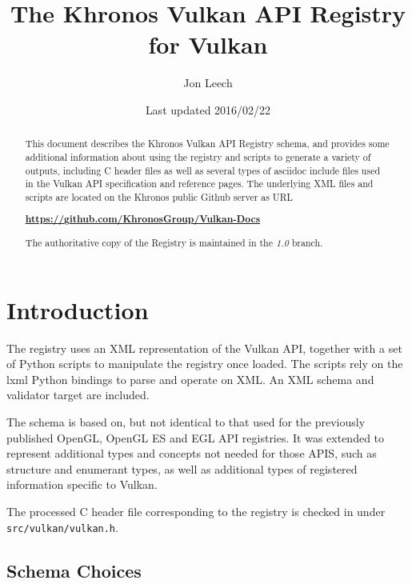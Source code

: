 \documentclass{article}
\begin{document}
\title{The Khronos Vulkan API Registry for Vulkan}
\author{Jon Leech}
\date{Last updated 2016/02/22}
\maketitle

\begin{abstract}

This document describes the Khronos Vulkan API Registry schema, and provides
some additional information about using the registry and scripts to generate
a variety of outputs, including C header files as well as several types of
asciidoc include files used in the Vulkan API specification and reference
pages. The underlying XML files and scripts are located on the Khronos
public Github server as URL

\begin{center}
{\bf \href{https://github.com/KhronosGroup/Vulkan-Docs}
          {https://github.com/KhronosGroup/Vulkan-Docs}}
\end{center}

The authoritative copy of the Registry is maintained in the {\em 1.0}
branch.

\end{abstract}

\tableofcontents

\section{Introduction}

The registry uses an XML representation of the Vulkan API, together with a
set of Python scripts to manipulate the registry once loaded. The scripts
rely on the lxml Python bindings to parse and operate on XML. An XML schema
and validator target are included.

The schema is based on, but not identical to that used for the previously
published OpenGL, OpenGL ES and EGL API registries. It was extended to
represent additional types and concepts not needed for those APIS, such as
structure and enumerant types, as well as additional types
of registered information specific to Vulkan.

The processed C header file corresponding to the registry is checked in
under {\tt src/vulkan/vulkan.h}.


\subsection{Schema Choices}
\end{document}
